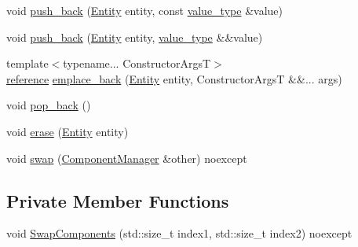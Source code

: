 \begin{DoxyCompactItemize}
void \mbox{\hyperlink{classmage_1_1_component_manager_aee2c65170dada47d99cec476b986b4c6}{push\+\_\+back}} (\mbox{\hyperlink{classmage_1_1_entity}{Entity}} entity, const \mbox{\hyperlink{classmage_1_1_component_manager_a56aac3b52842bd8955253fa9b528a58d}{value\+\_\+type}} \&value)
\item 
void \mbox{\hyperlink{classmage_1_1_component_manager_a62c25a923c959d535d0427bec2ca44cf}{push\+\_\+back}} (\mbox{\hyperlink{classmage_1_1_entity}{Entity}} entity, \mbox{\hyperlink{classmage_1_1_component_manager_a56aac3b52842bd8955253fa9b528a58d}{value\+\_\+type}} \&\&value)
\item 
{\footnotesize template$<$typename... Constructor\+ArgsT$>$ }\\\mbox{\hyperlink{classmage_1_1_component_manager_a4daeb292f527534c155e359faf7eaf80}{reference}} \mbox{\hyperlink{classmage_1_1_component_manager_ad7c2c45d7c5f651144b9d62b91b2ea6d}{emplace\+\_\+back}} (\mbox{\hyperlink{classmage_1_1_entity}{Entity}} entity, Constructor\+ArgsT \&\&... args)
\item 
void \mbox{\hyperlink{classmage_1_1_component_manager_a069077191e2be628be910aaa5250b5f1}{pop\+\_\+back}} ()
\item 
void \mbox{\hyperlink{classmage_1_1_component_manager_a48b0c1e1b0efac98bb54b8c78e1dde65}{erase}} (\mbox{\hyperlink{classmage_1_1_entity}{Entity}} entity)
\item 
void \mbox{\hyperlink{classmage_1_1_component_manager_a9ba4d698e4def14da6997326c61d9a92}{swap}} (\mbox{\hyperlink{classmage_1_1_component_manager}{Component\+Manager}} \&other) noexcept
\end{DoxyCompactItemize}
\subsection*{Private Member Functions}
\begin{DoxyCompactItemize}
\item 
void \mbox{\hyperlink{classmage_1_1_component_manager_aa3a4d3976380849c44b8756515d2f3f1}{Swap\+Components}} (std\+::size\+\_\+t index1, std\+::size\+\_\+t index2) noexcept
\end{DoxyCompactItemize}
